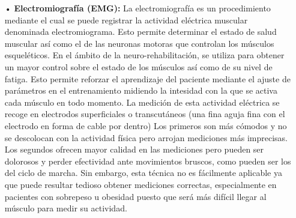 \begin{itemize}
\item[•] \textbf{Electromiografía (EMG):} La electromiografía es un procedimiento mediante el cual se puede registrar la actividad eléctrica muscular denominada electromiograma. Esto permite determinar el estado de salud muscular así como el de las neuronas motoras que controlan los músculos esqueléticos\cite{EMG}. En el ámbito de la neuro-rehabilitación, se utiliza para obtener un mayor control sobre el estado de los músculos así como de su nivel de fatiga. Esto permite reforzar el aprendizaje del paciente mediante el ajuste de parámetros en el entrenamiento midiendo la intesidad con la que se activa cada músculo en todo momento\cite{EMG2}. La medición de esta actividad eléctrica se recoge en electrodos superficiales o transcutáneos (una fina aguja fina con el electrodo en forma de cable por dentro) Los primeros son más cómodos y no se descolocan con la actividad física pero arrojan mediciones más imprecisas. Los segundos ofrecen mayor calidad en las mediciones pero pueden ser dolorosos y perder efectividad ante movimientos bruscos, como pueden ser los del ciclo de marcha. Sin embargo, esta técnica no es fácilmente aplicable ya que puede resultar tedioso obtener mediciones correctas, especialmente en pacientes con sobrepeso u obesidad puesto que será más difícil llegar al músculo para medir su actividad.
\end{itemize}




